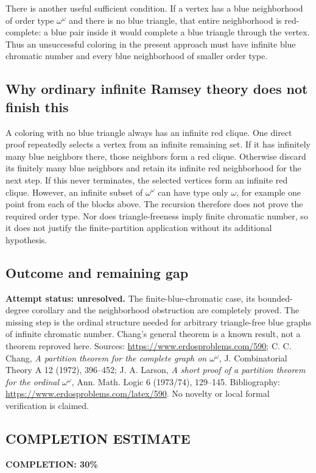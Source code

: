There is another useful sufficient condition. If a vertex has a blue neighborhood of order type $\omega^\omega$ and there is no blue triangle, that entire neighborhood is red-complete: a blue pair inside it would complete a blue triangle through the vertex. Thus an unsuccessful coloring in the present approach must have infinite blue chromatic number and every blue neighborhood of smaller order type.

\subsection*{Why ordinary infinite Ramsey theory does not finish this}
A coloring with no blue triangle always has an infinite red clique. One direct proof repeatedly selects a vertex from an infinite remaining set. If it has infinitely many blue neighbors there, those neighbors form a red clique. Otherwise discard its finitely many blue neighbors and retain its infinite red neighborhood for the next step. If this never terminates, the selected vertices form an infinite red clique.
However, an infinite subset of $\omega^\omega$ can have type only $\omega$, for example one point from each of the blocks above. The recursion therefore does not prove the required order type. Nor does triangle-freeness imply finite chromatic number, so it does not justify the finite-partition application without its additional hypothesis.

\subsection*{Outcome and remaining gap}
\textbf{Attempt status: unresolved.} The finite-blue-chromatic case, its bounded-degree corollary and the neighborhood obstruction are completely proved. The missing step is the ordinal structure needed for arbitrary triangle-free blue graphs of infinite chromatic number. Chang's general theorem is a known result, not a theorem reproved here.
Sources: \url{https://www.erdosproblems.com/590}; C. C. Chang, \emph{A partition theorem for the complete graph on $\omega^\omega$}, J. Combinatorial Theory A 12 (1972), 396--452; J. A. Larson, \emph{A short proof of a partition theorem for the ordinal $\omega^\omega$}, Ann. Math. Logic 6 (1973/74), 129--145. Bibliography: \url{https://www.erdosproblems.com/latex/590}. No novelty or local formal verification is claimed.

\subsection*{COMPLETION ESTIMATE}
\textbf{COMPLETION: 30\%}
